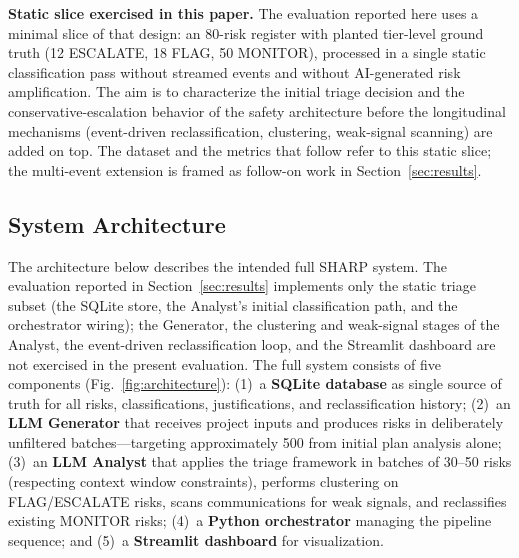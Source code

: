 \documentclass[runningheads]{llncs}
\begin{document}
\textbf{Static slice exercised in this paper.} The evaluation reported here uses a minimal slice of that design: an 80-risk register with planted tier-level ground truth (12 ESCALATE, 18 FLAG, 50 MONITOR), processed in a single static classification pass without streamed events and without AI-generated risk amplification. The aim is to characterize the initial triage decision and the conservative-escalation behavior of the safety architecture before the longitudinal mechanisms (event-driven reclassification, clustering, weak-signal scanning) are added on top. The dataset and the metrics that follow refer to this static slice; the multi-event extension is framed as follow-on work in Section~\ref{sec:results}.

\subsection{System Architecture}

The architecture below describes the intended full SHARP system. The evaluation reported in Section~\ref{sec:results} implements only the static triage subset (the SQLite store, the Analyst's initial classification path, and the orchestrator wiring); the Generator, the clustering and weak-signal stages of the Analyst, the event-driven reclassification loop, and the Streamlit dashboard are not exercised in the present evaluation. The full system consists of five components (Fig.~\ref{fig:architecture}): (1)~a \textbf{SQLite database} as single source of truth for all risks, classifications, justifications, and reclassification history; (2)~an \textbf{LLM Generator} that receives project inputs and produces risks in deliberately unfiltered batches---targeting approximately 500 from initial plan analysis alone; (3)~an \textbf{LLM Analyst} that applies the triage framework in batches of 30--50 risks (respecting context window constraints), performs clustering on FLAG/ESCALATE risks, scans communications for weak signals, and reclassifies existing MONITOR risks; (4)~a \textbf{Python orchestrator} managing the pipeline sequence; and (5)~a \textbf{Streamlit dashboard} for visualization.
\end{document}
